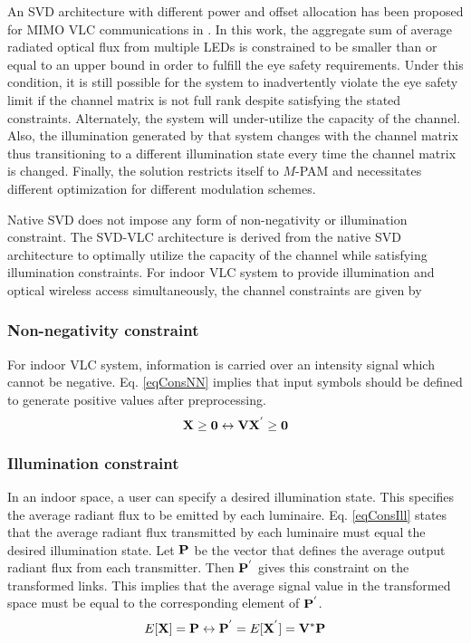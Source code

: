 An SVD architecture with different power and offset allocation has been proposed for MIMO VLC communications in \cite{par11a}. In this work, the aggregate sum of average radiated optical flux from multiple LEDs is constrained to be smaller than or equal to an upper bound in order to fulfill the eye safety requirements. Under this condition, it is still possible for the system to inadvertently violate the eye safety limit if the channel matrix is not full rank despite satisfying the stated constraints. Alternately, the system will under-utilize the capacity of the channel. Also, the illumination generated by that system changes with the channel matrix thus transitioning to a different illumination state every time the channel matrix is changed. Finally, the solution restricts itself to $M$-PAM and necessitates different optimization for different modulation schemes.

Native SVD does not impose any form of non-negativity or illumination constraint. The SVD-VLC architecture is derived from the native SVD architecture to optimally utilize the capacity of the channel while satisfying illumination constraints. For indoor VLC system to provide illumination and optical wireless access simultaneously, the channel constraints are given by

\subsubsection{Non-negativity constraint}
\label{subsubsec:svdvlcSystemNonnegative}

For indoor VLC system, information is carried over an intensity signal which cannot be negative. Eq. \eqref{eqConsNN} implies that input symbols should be defined to generate positive values after preprocessing.
\begin{equation}
	\label{eqConsNN}
	{\bf{X}} \geq {\bf{0}} \leftrightarrow {\bf{V}}{\bf{X}}^{'} \geq {\bf{0}}\\
\end{equation}
	
\subsubsection{Illumination constraint}
\label{subsubsec:svdvlcSystemIllumination}

In an indoor space, a user can specify a desired illumination state. This specifies the average radiant flux to be emitted by each luminaire. Eq. \eqref{eqConsIll} states that the average radiant flux transmitted by each luminaire must equal the desired illumination state. Let ${\bf{P}}$ be the vector that defines the average output radiant flux from each transmitter. Then ${\bf{P}}^{'}$ gives this constraint on the transformed links. This implies that the average signal value in the transformed space must be equal to the corresponding element of ${\bf{P}}^{'}$. 
\begin{equation}
	\label{eqConsIll}
	E[{\bf{X}}] = {\bf{P}} \leftrightarrow {\bf{P}}^{'} = E[{\bf{X}}^{'}] = {\bf{V}}^{*}{\bf{P}}
\end{equation}

